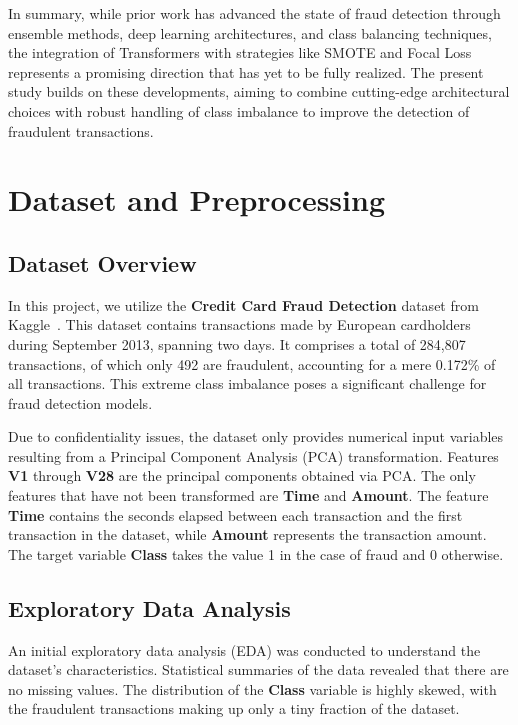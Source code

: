 \documentclass[11pt, oneside]{article}   	%
\begin{document}
In summary, while prior work has advanced the state of fraud detection through ensemble methods, deep learning architectures, and class balancing techniques, the integration of Transformers with strategies like SMOTE and Focal Loss represents a promising direction that has yet to be fully realized. The present study builds on these developments, aiming to combine cutting-edge architectural choices with robust handling of class imbalance to improve the detection of fraudulent transactions.

\section{Dataset and Preprocessing}

\subsection{Dataset Overview}

In this project, we utilize the \textbf{Credit Card Fraud Detection} dataset from Kaggle~\cite{kagglecreditcardfraud}. This dataset contains transactions made by European cardholders during September 2013, spanning two days. It comprises a total of 284,807 transactions, of which only 492 are fraudulent, accounting for a mere 0.172\% of all transactions. This extreme class imbalance poses a significant challenge for fraud detection models.

Due to confidentiality issues, the dataset only provides numerical input variables resulting from a Principal Component Analysis (PCA) transformation. Features \textbf{V1} through \textbf{V28} are the principal components obtained via PCA. The only features that have not been transformed are \textbf{Time} and \textbf{Amount}. The feature \textbf{Time} contains the seconds elapsed between each transaction and the first transaction in the dataset, while \textbf{Amount} represents the transaction amount. The target variable \textbf{Class} takes the value 1 in the case of fraud and 0 otherwise.

\subsection{Exploratory Data Analysis}

An initial exploratory data analysis (EDA) was conducted to understand the dataset's characteristics. Statistical summaries of the data revealed that there are no missing values. The distribution of the \textbf{Class} variable is highly skewed, with the fraudulent transactions making up only a tiny fraction of the dataset.
\end{document}
